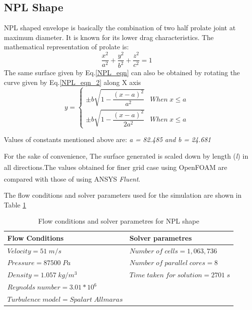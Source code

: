 \subsection{NPL Shape \cite{cheeseman2012}}
NPL shaped envelope is basically the combination of two half prolate joint at maximum diameter. It is known for its lower drag characteristics. The mathematical representation of prolate is:
\begin{equation}
\frac{x^{2}}{a^{2}} + \frac{y^{2}}{b^{2}} + \frac{z^{2}}{c^{2}} = 1
\label{NPL_eqn}
\end{equation}
The same surface given by Eq.\ref{NPL_eqn} can also be obtained by rotating the curve given by Eq.\ref{NPL_eqn_2} along X axis
\begin{equation}
y = \begin{cases}
\pm b \sqrt{1-\dfrac{(x-a)^{2}}{a^{2}}} & When \; x \le a \\
\pm b \sqrt{1-\dfrac{(x-a)^{2}}{2a^{2}}} & When \; x \le a
\end{cases}
\label{NPL_eqn_2}
\end{equation}

Values of constants mentioned above are: \textit{a = 82.485  \quad and \quad b = 24.681  }

For the sake of convenience, The surface generated is scaled down by length (\textit{l}) in all directions.The values obtained for finer grid case using OpenFOAM\textsuperscript{\textregistered} are compared with those of using ANSYS\textsuperscript{\textregistered} \textit{Fluent}. 

The flow conditions and solver parameters used for the simulation are shown in Table \ref{Flow conditions and solver parametres for NPL shape}

\begin{table}[H]
	\caption{Flow conditions and solver parametres for NPL shape}
	\label{Flow conditions and solver parametres for NPL shape}
	\centering
	\begin{tabular}{ll}
		\hline \hline
		Flow Conditions & Solver parametres  \\ \hline \hline
		
		$ Velocity = 51 \; m/s$ & $Number \; of \; cells = 1,063,736$    \\  
		$ Pressure = 87500 \; Pa $ & $ Number \; of \; parallel \; cores = 8 $     \\
		$ Density = 1.057 \; kg/m^{3} $ & $ Time \; taken \; for \; solution = 2701 \; s  $    \\
		$ Reynolds \; number = 3.01 * 10^{6} $ &    \\
		$ Turbulence \; model = Spalart \; Allmaras $ &     \\
		\hline
	\end{tabular}
\end{table}



